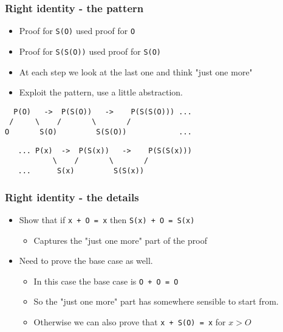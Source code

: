 \documentclass{beamer}
\begin{document}
\begin{frame}[fragile]
    \frametitle {Right identity - the pattern}

\begin{itemize}
\item Proof for \Verb?S(O)? used proof for \Verb?O?
\item Proof for \Verb?S(S(O))? used proof for \Verb?S(O)?
\item At each step we look at the last one and think "just one more"
\item Exploit the pattern, use a little abstraction.
\end{itemize}

\begin{verbatim}
  P(O)   ->  P(S(O))   ->    P(S(S(O))) ...
 /     \    /       \       / 
O       S(O)         S(S(O))            ...
\end{verbatim}

\begin{verbatim}
   ... P(x)  ->  P(S(x))   ->    P(S(S(x)))
           \    /       \       /
   ...      S(x)         S(S(x))
\end{verbatim}

\end{frame}

\begin{frame}[fragile]
    \frametitle {Right identity - the details}

\begin{itemize}
\item Show that if \Verb?x + O = x? then \Verb?S(x) + O = S(x)? 
    \begin{itemize}
        \item Captures the "just one more" part of the proof
    \end{itemize}
\item Need to prove the base case as well.
    \begin{itemize}
    \item In this case the base case is \Verb?O + O = O?
    \item So the "just one more" part has somewhere sensible to start from.
    \item Otherwise we can also prove that \Verb?x + S(O) = x? for $x > O$
    \end{itemize}
\end{itemize}

\end{frame}
\end{document}
